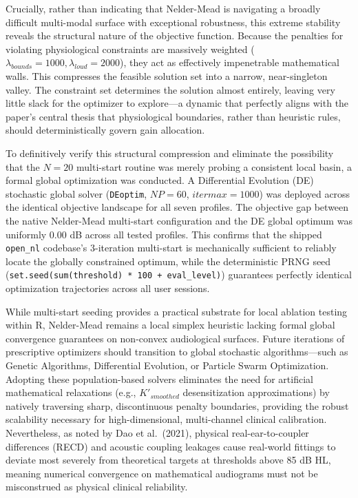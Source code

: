 \documentclass[
  12pt,
]{article}
\begin{document}
Crucially, rather than indicating that Nelder-Mead is navigating a
broadly difficult multi-modal surface with exceptional robustness, this
extreme stability reveals the structural nature of the objective
function. Because the penalties for violating physiological constraints
are massively weighted
(\(\lambda_{bounds} = 1000, \lambda_{loud} = 2000\)), they act as
effectively impenetrable mathematical walls. This compresses the
feasible solution set into a narrow, near-singleton valley. The
constraint set determines the solution almost entirely, leaving very
little slack for the optimizer to explore---a dynamic that perfectly
aligns with the paper's central thesis that physiological boundaries,
rather than heuristic rules, should deterministically govern gain
allocation.

To definitively verify this structural compression and eliminate the
possibility that the \(N=20\) multi-start routine was merely probing a
consistent local basin, a formal global optimization was conducted. A
Differential Evolution (DE) stochastic global solver (\texttt{DEoptim},
\(NP=60\), \(itermax=1000\)) was deployed across the identical objective
landscape for all seven profiles. The objective gap between the native
Nelder-Mead multi-start configuration and the DE global optimum was
uniformly \(0.00\) dB across all tested profiles. This confirms that the
shipped \texttt{open\_nl} codebase's 3-iteration multi-start is
mechanically sufficient to reliably locate the globally constrained
optimum, while the deterministic PRNG seed
(\texttt{set.seed(sum(threshold)\ *\ 100\ +\ eval\_level)}) guarantees
perfectly identical optimization trajectories across all user sessions.

While multi-start seeding provides a practical substrate for local
ablation testing within R, Nelder-Mead remains a local simplex heuristic
lacking formal global convergence guarantees on non-convex audiological
surfaces. Future iterations of prescriptive optimizers should transition
to global stochastic algorithms---such as Genetic Algorithms,
Differential Evolution, or Particle Swarm Optimization. Adopting these
population-based solvers eliminates the need for artificial mathematical
relaxations (e.g., \(K'_{smoothed}\) desensitization approximations) by
natively traversing sharp, discontinuous penalty boundaries, providing
the robust scalability necessary for high-dimensional, multi-channel
clinical calibration. Nevertheless, as noted by Dao et al.~(2021),
physical real-ear-to-coupler differences (RECD) and acoustic coupling
leakages cause real-world fittings to deviate most severely from
theoretical targets at thresholds above 85 dB HL, meaning numerical
convergence on mathematical audiograms must not be misconstrued as
physical clinical reliability.
\end{document}
